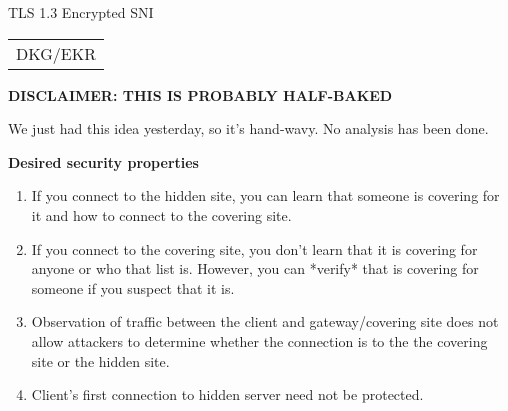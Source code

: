 \documentclass[helvetica]{seminar}
\newcommand{\heading}[1]{%
  \begin{center} 
    \large\bf 
    #1 
  \end{center} 
  \vspace{.4 in}}
\begin{document}
\begin{slide}
\begin{center}
\vspace{.5 in}
\LARGE{{\bf}TLS 1.3 Encrypted SNI}\\
\vspace{.2in}
\large{
\begin{tabular}{c}
DKG/EKR
\end{tabular}
}
\end{center}

\end{slide}

\begin{slide}
\heading{DISCLAIMER: THIS IS PROBABLY HALF-BAKED}

We just had this idea yesterday, so it's hand-wavy. No analysis has been done.
\end{slide}


\centerslidesfalse 

\begin{slide}
\heading{Desired security properties}

\begin{enumerate}
\item If you connect to the hidden site, you can learn that someone is covering
   for it and how to connect to the covering site.
\item If you connect to the covering site, you don't learn that it is covering
   for anyone or who that list is. However, you can *verify* that is covering
   for someone if you suspect that it is.
\item Observation of traffic between the client and gateway/covering site does not allow attackers
   to determine whether the connection is to the the covering site or the
   hidden site.
\item Client's first connection to hidden server need not be protected.
\end{enumerate}

\end{slide}
\end{document}
